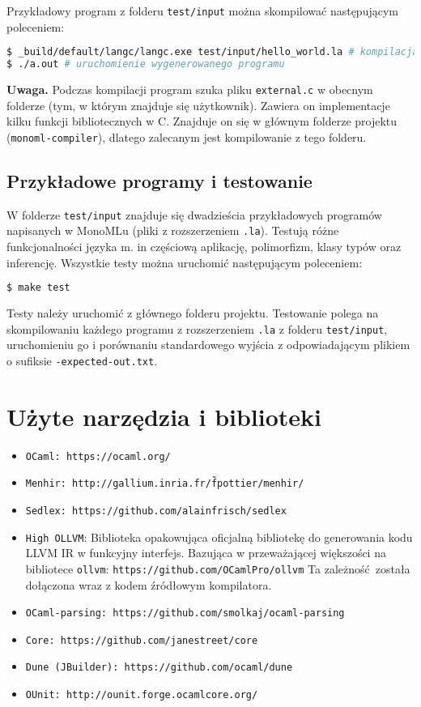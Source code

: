\documentclass[declaration,shortabstract]{iithesis}
\begin{document}
Przykładowy program z folderu \texttt{test/input} można skompilować następującym 
poleceniem: 
\begin{lstlisting}[language=bash]
$ _build/default/langc/langc.exe test/input/hello_world.la # kompilacja 
$ ./a.out # uruchomienie wygenerowanego programu 
\end{lstlisting}

\textbf{Uwaga.} Podczas kompilacji program szuka pliku \texttt{external.c} w 
obecnym folderze (tym, w którym znajduje się użytkownik). Zawiera on  
implementacje kilku funkcji bibliotecznych w C. Znajduje on się w 
głównym folderze projektu \newline(\texttt{monoml-compiler}), dlatego 
zalecanym jest kompilowanie z tego folderu.

\subsection{Przykładowe programy i testowanie}

W folderze \texttt{test/input} znajduje się dwadzieścia przykładowych programów
napisanych w MonoMLu (pliki z rozszerzeniem \texttt{.la}). Testują różne funkcjonalności języka m. in 
częściową aplikację, polimorfizm, klasy typów oraz inferencję. 
Wszystkie testy można uruchomić następującym poleceniem:
\begin{lstlisting}[language=bash]
$ make test
\end{lstlisting}
Testy należy uruchomić z głównego folderu projektu.
Testowanie polega na skompilowaniu każdego programu z rozszerzeniem \texttt{.la}
z folderu \texttt{test/input}, uruchomieniu go i porównaniu standardowego 
wyjścia z odpowiadającym plikiem o sufiksie \texttt{-expected-out.txt}.

\section{Użyte narzędzia i biblioteki}

\begin{itemize}
  \item \texttt{OCaml: https://ocaml.org/}
  \item \texttt{Menhir: http://gallium.inria.fr/\~fpottier/menhir/}
  \item \texttt{Sedlex: https://github.com/alainfrisch/sedlex}
  \item \texttt{High OLLVM}: Biblioteka opakowująca oficjalną bibliotekę do 
  generowania kodu LLVM IR w funkcyjny interfejs. Bazująca w przeważającej większości 
  na bibliotece \texttt{ollvm}: 
  \texttt{https://github.com/OCamlPro/ollvm}
  Ta zależność została dołączona wraz z kodem źródłowym kompilatora.
  \item \texttt{OCaml-parsing: https://github.com/smolkaj/ocaml-parsing}
  \item \texttt{Core: https://github.com/janestreet/core} 
  \item \texttt{Dune (JBuilder): https://github.com/ocaml/dune} 
  \item \texttt{OUnit: http://ounit.forge.ocamlcore.org/} 
\end{itemize}
\end{document}
